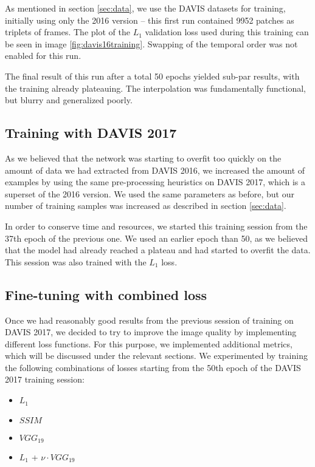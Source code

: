 \documentclass[10pt,twocolumn,letterpaper]{article}
\begin{document}
As mentioned in section \ref{sec:data}, we use the DAVIS datasets for training, initially using only the 2016 version -- this first run contained 9952 patches as triplets of frames. The plot of the $L_1$ validation loss used during this training can be seen in image \ref{fig:davis16training}. Swapping of the temporal order was not enabled for this run. 

The final result of this run after a total 50 epochs yielded sub-par results, with the training already plateauing. The interpolation was fundamentally functional, but blurry and generalized poorly.


\subsection{Training with DAVIS 2017}
As we believed that the network was starting to overfit too quickly on the amount of data we had extracted from DAVIS 2016, we increased the amount of examples by using the same pre-processing heuristics on DAVIS 2017, which is a superset of the 2016 version. We used the same parameters as before, but our number of training samples was increased as described in section \ref{sec:data}.

In order to conserve time and resources, we started this training session from the 37th epoch of the previous one. We used an earlier epoch than 50, as we believed that the model had already reached a plateau and had started to overfit the data. This session was also trained with the $L_1$ loss. 


\subsection{Fine-tuning with combined loss}
Once we had reasonably good results from the previous session of training on DAVIS 2017, we decided to try to improve the image quality by implementing different loss functions. For this purpose, we implemented additional metrics, which will be discussed under the relevant sections. We experimented by training the following combinations of losses starting from the 50th epoch of the DAVIS 2017 training session:

\begin{itemize}
    \item $L_1$
    \item $SSIM$
    \item $VGG_{19}$
    \item $L_1$ + $\nu \cdot VGG_{19}$
\end{itemize}
\end{document}
